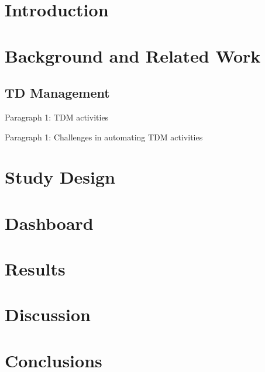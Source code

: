 \chapter{Introduction}



\chapter{Background and Related Work}

\section{TD Management}

Paragraph 1: TDM activities

Paragraph 1: Challenges in automating TDM activities


\chapter{Study Design}

\chapter{Dashboard}

\chapter{Results}

\chapter{Discussion}

\chapter{Conclusions}




